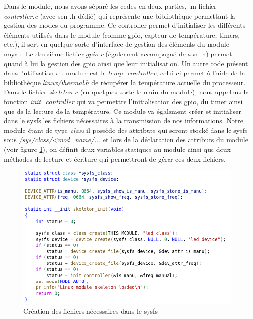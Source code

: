 \documentclass{ReportTemplate}
\begin{document}
Dans le module, nous avons séparé les codes en deux parties, un fichier
\textit{controller.c} (avec son .h dédié) qui représente une bibliothèque
permettant la gestion des modes du programme. Ce controller permet d'initialiser
les différents éléments utilisés dans le module (comme gpio, capteur de
température, timers, etc.), il sert en quelque sorte d'interface de gestion des
éléments du module noyau.\newline
Le deuxième fichier \textit{gpio.c} (également accompagné de son .h) permet quand à lui la gestion
des gpio ainsi que leur initialisation.\newline
Un autre code présent dans l'utilisation du module est le
\textit{temp\_controller}, celui-ci permet à l'aide de la bibliothèque
\textit{linux/thermal.h} de récupérer la température actuelle du
processeur.\newline
Dans le fichier \textit{skeleton.c} (en quelques sorte le main du module), nous
appelons la fonction \textit{init\_controller} qui va permettre l'initialisation
des gpio, du timer ainsi que de la lecture de la température.\newline
Ce module va également créer et initialiser dans le sysfs les fichiers
nécessaires à la transmission de nos informations.\newline
Notre module étant de type \textit{class} il possède des attributs qui seront
stocké dans le sysfs sous \textit{/sys/class/<mod\_name/...} et lors de la
déclaration des attributs du module (voir figure \ref{fig:sysfsInit}), on
définit deux variables statiques au module ainsi que deux méthodes de lecture et
écriture qui permettront de gérer ces deux fichiers.
\begin{figure}[H]
    \includegraphics[width= \textwidth]{imageSources/Skeleton_Init.png}
    \caption{Création des fichiers nécessaires dans le sysfs}
    \label{fig:sysfsInit}
\end{figure}
\end{document}
